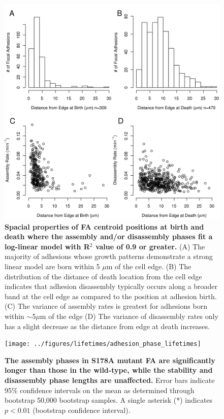 \documentclass[letterpaper,draft]{article}
\begin{document}
\begin{figure}[htbp]
\begin{center}
\includegraphics[width=\textwidth]{../figures/spacial/spacial}
\caption{
{\bf Spacial properties of FA centroid positions at birth and death where the assembly and/or disassembly phases fit a log-linear model with R$^2$ value of 0.9 or greater.} (A) The majority of adhesions whose growth patterns demonstrate a strong linear model are born within 5 $\mu$m of the cell edge. (B) The distribution of the distance of death location from the cell edge indicates that adhesion disassembly typically occurs along a broader band at the cell edge as compared to the position at adhesion birth. (C) The variance of assembly rates is greatest for adhesions born within $\sim$5$\mu$m of the edge (D) The variance of disassembly rates only has a slight decrease as the distance from edge at death increases.
}
\label{spacial}
\end{center}
\end{figure}

\begin{figure}[htbp]
\begin{center}
\texttt{[image: ../figures/lifetimes/adhesion\_phase\_lifetimes]}
\caption{
{\bf The assembly phases in S178A mutant FA are significantly longer than those in the wild-type, while the stability and disassembly phase lengths are unaffected.} Error bars indicate 95\% confidence intervals on the mean as determined through bootstrap 50,000 bootstrap samples. A single asterisk (*) indicates $p<0.01$ (bootstrap confidence interval).
}
\label{lifetimes}
\end{center}
\end{figure}
\end{document}
